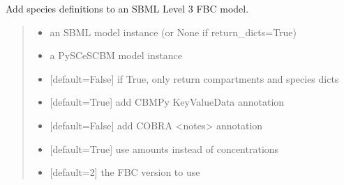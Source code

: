 \documentclass[letterpaper,12pt,english]{sphinxmanual}
\begin{document}
\begin{fulllineitems}
\label{\detokenize{api/io:cbmpy.CBXML.sbml_setSpeciesL3}}
\pysigstartsignatures
\pysiglinewithargsret
{}
{\sphinxparamcomma {}\sphinxparamcomma {}\sphinxparamcomma {}\sphinxparamcomma {}\sphinxparamcomma {}\sphinxparamcomma {}}
{}
\pysigstopsignatures
\sphinxAtStartPar
Add species definitions to an SBML Level 3 FBC model.
\begin{quote}\begin{description}
\begin{itemize}
\item {} 
\sphinxAtStartPar
{} \textendash{} an SBML model instance (or None if return\_dicts=True)

\item {} 
\sphinxAtStartPar
{} \textendash{} a PySCeSCBM model instance

\item {} 
\sphinxAtStartPar
{} \textendash{} {[}default=False{]} if True, only return compartments and species dicts

\item {} 
\sphinxAtStartPar
{} \textendash{} {[}default=True{]} add CBMPy KeyValueData annotation

\item {} 
\sphinxAtStartPar
{} \textendash{} {[}default=False{]} add COBRA \textless{}notes\textgreater{} annotation

\item {} 
\sphinxAtStartPar
{} \textendash{} {[}default=True{]} use amounts instead of concentrations

\item {} 
\sphinxAtStartPar
{} \textendash{} {[}default=2{]} the FBC version to use

\end{itemize}

\sphinxAtStartPar
{}

\end{description}\end{quote}

\end{fulllineitems}
\end{document}
